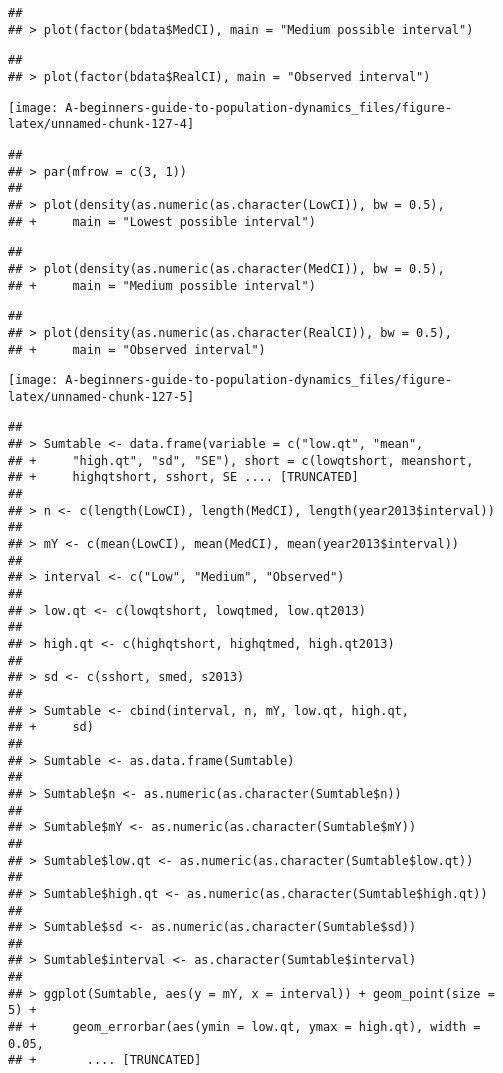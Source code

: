 \documentclass[]{book}
\begin{document}
\begin{verbatim}
## 
## > plot(factor(bdata$MedCI), main = "Medium possible interval")
\end{verbatim}

\begin{verbatim}
## 
## > plot(factor(bdata$RealCI), main = "Observed interval")
\end{verbatim}

\begin{center}\texttt{[image: A-beginners-guide-to-population-dynamics\_files/figure-latex/unnamed-chunk-127-4]} \end{center}

\begin{verbatim}
## 
## > par(mfrow = c(3, 1))
## 
## > plot(density(as.numeric(as.character(LowCI)), bw = 0.5), 
## +     main = "Lowest possible interval")
\end{verbatim}

\begin{verbatim}
## 
## > plot(density(as.numeric(as.character(MedCI)), bw = 0.5), 
## +     main = "Medium possible interval")
\end{verbatim}

\begin{verbatim}
## 
## > plot(density(as.numeric(as.character(RealCI)), bw = 0.5), 
## +     main = "Observed interval")
\end{verbatim}

\begin{center}\texttt{[image: A-beginners-guide-to-population-dynamics\_files/figure-latex/unnamed-chunk-127-5]} \end{center}

\begin{verbatim}
## 
## > Sumtable <- data.frame(variable = c("low.qt", "mean", 
## +     "high.qt", "sd", "SE"), short = c(lowqtshort, meanshort, 
## +     highqtshort, sshort, SE .... [TRUNCATED] 
## 
## > n <- c(length(LowCI), length(MedCI), length(year2013$interval))
## 
## > mY <- c(mean(LowCI), mean(MedCI), mean(year2013$interval))
## 
## > interval <- c("Low", "Medium", "Observed")
## 
## > low.qt <- c(lowqtshort, lowqtmed, low.qt2013)
## 
## > high.qt <- c(highqtshort, highqtmed, high.qt2013)
## 
## > sd <- c(sshort, smed, s2013)
## 
## > Sumtable <- cbind(interval, n, mY, low.qt, high.qt, 
## +     sd)
## 
## > Sumtable <- as.data.frame(Sumtable)
## 
## > Sumtable$n <- as.numeric(as.character(Sumtable$n))
## 
## > Sumtable$mY <- as.numeric(as.character(Sumtable$mY))
## 
## > Sumtable$low.qt <- as.numeric(as.character(Sumtable$low.qt))
## 
## > Sumtable$high.qt <- as.numeric(as.character(Sumtable$high.qt))
## 
## > Sumtable$sd <- as.numeric(as.character(Sumtable$sd))
## 
## > Sumtable$interval <- as.character(Sumtable$interval)
## 
## > ggplot(Sumtable, aes(y = mY, x = interval)) + geom_point(size = 5) + 
## +     geom_errorbar(aes(ymin = low.qt, ymax = high.qt), width = 0.05, 
## +       .... [TRUNCATED]
\end{verbatim}
\end{document}
